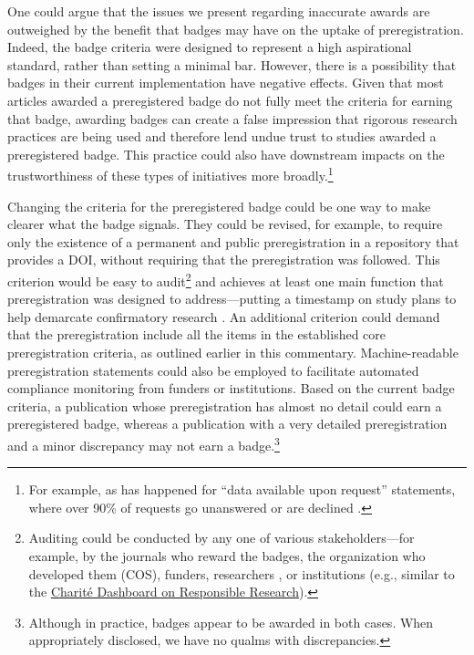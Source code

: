 \documentclass[authordate, meta]{jote-new-article}
\begin{document}
One could argue that the issues we present regarding inaccurate awards are outweighed by the benefit that badges may have on the uptake of preregistration. Indeed, the badge criteria were designed to represent a high aspirational standard, rather than setting a minimal bar. However, there is a possibility that badges in their current implementation have negative effects. Given that most articles awarded a preregistered badge do not fully meet the criteria for earning that badge, awarding badges can create a false impression that rigorous research practices are being used and therefore lend undue trust to studies awarded a preregistered badge. This practice could also have downstream impacts on the trustworthiness of these types of initiatives more broadly.\footnote{ For example, as has happened for “data available upon request” statements, where over 90\% of requests go unanswered or are declined \parencites{Gabelica2022}.}







Changing the criteria for the preregistered badge could be one way to make clearer what the badge signals. They could be revised, for example, to require only the existence of a permanent and public preregistration in a repository that provides a DOI, without requiring that the preregistration was followed. This criterion would be easy to audit\footnote{ Auditing could be conducted by any one of various stakeholders—for example, by the journals who reward the badges, the organization who developed them (COS), funders, researchers \parencites[e.g., similar to the \href{http://web.archive.org/save/https://fdaaa.trialstracker.net/}{FDAAA Trials Tracker}][]{DeVito2019}, or institutions (e.g., similar to the \href{http://web.archive.org/save/https://quest-dashboard.charite.de/}{Charité Dashboard on Responsible Research}).} and achieves at least one main function that preregistration was designed to address—putting a timestamp on study plans to help demarcate confirmatory research \parencites{Nosek2018}. An additional criterion could demand that the preregistration include all the items in the established core preregistration criteria, as outlined earlier in this commentary. Machine-readable preregistration statements could also be employed to facilitate automated compliance monitoring from funders or institutions. Based on the current badge criteria, a publication whose preregistration has almost no detail could earn a preregistered badge, whereas a publication with a very detailed preregistration and a minor discrepancy may not earn a badge.\footnote{ Although in practice, badges appear to be awarded in both cases. When appropriately disclosed, we have no qualms with discrepancies.}
\end{document}
